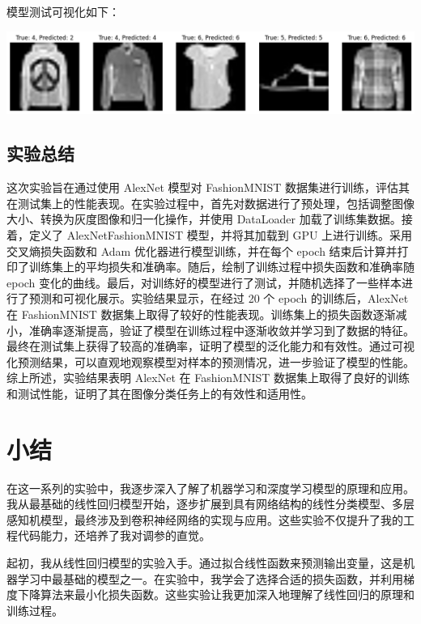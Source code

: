 \documentclass[a4paper,12pt]{article}
\begin{document}
\justifying


模型测试可视化如下：

\centering %
\includegraphics[width=0.8\linewidth]{images/lab2_5_result.png}

\justifying
\subsection{实验总结}
这次实验旨在通过使用 AlexNet 模型对 FashionMNIST 数据集进行训练，评估其在测试集上的性能表现。在实验过程中，首先对数据进行了预处理，包括调整图像大小、转换为灰度图像和归一化操作，并使用 DataLoader 加载了训练集数据。接着，定义了 AlexNetFashionMNIST 模型，并将其加载到 GPU 上进行训练。采用交叉熵损失函数和 Adam 优化器进行模型训练，并在每个 epoch 结束后计算并打印了训练集上的平均损失和准确率。随后，绘制了训练过程中损失函数和准确率随 epoch 变化的曲线。最后，对训练好的模型进行了测试，并随机选择了一些样本进行了预测和可视化展示。实验结果显示，在经过 20 个 epoch 的训练后，AlexNet 在 FashionMNIST 数据集上取得了较好的性能表现。训练集上的损失函数逐渐减小，准确率逐渐提高，验证了模型在训练过程中逐渐收敛并学习到了数据的特征。最终在测试集上获得了较高的准确率，证明了模型的泛化能力和有效性。通过可视化预测结果，可以直观地观察模型对样本的预测情况，进一步验证了模型的性能。综上所述，实验结果表明 AlexNet 在 FashionMNIST 数据集上取得了良好的训练和测试性能，证明了其在图像分类任务上的有效性和适用性。

\newpage

\section*{小结}
在这一系列的实验中，我逐步深入了解了机器学习和深度学习模型的原理和应用。我从最基础的线性回归模型开始，逐步扩展到具有网络结构的线性分类模型、多层感知机模型，最终涉及到卷积神经网络的实现与应用。这些实验不仅提升了我的工程代码能力，还培养了我对调参的直觉。

起初，我从线性回归模型的实验入手。通过拟合线性函数来预测输出变量，这是机器学习中最基础的模型之一。在实验中，我学会了选择合适的损失函数，并利用梯度下降算法来最小化损失函数。这些实验让我更加深入地理解了线性回归的原理和训练过程。
\end{document}
